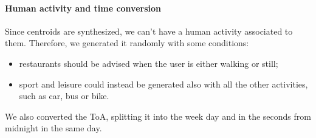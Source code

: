 \documentclass[../../main]{subfiles}
\begin{document}
\paragraph{Human activity and time conversion}
Since centroids are synthesized, we can't have a human activity associated to them.
Therefore, we generated it randomly with some conditions:
\begin{itemize}
    \item restaurants should be advised when the user is either walking or still;
    \item sport and leisure could instead be generated also with all the other activities, such as car, bus or bike.
\end{itemize}
We also converted the ToA, splitting it into the week day and in the seconds from midnight in the same day.
\end{document}
